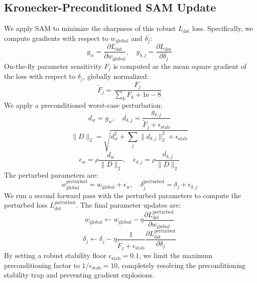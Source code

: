 \documentclass{article}
\theoremstyle{plain}
\theoremstyle{definition}
\theoremstyle{remark}
\begin{document}
\subsection{Kronecker-Preconditioned SAM Update}
We apply SAM to minimize the sharpness of this robust $L_{\text{dst}}$ loss. Specifically, we compute gradients with respect to $w_{\text{global}}$ and $\delta_j$:
\begin{equation}
    g_w = \frac{\partial L_{\text{dst}}}{\partial w_{\text{global}}}, \quad g_{\delta, j} = \frac{\partial L_{\text{dst}}}{\partial \delta_j}
\end{equation}
On-the-fly parameter sensitivity $F_j$ is computed as the mean square gradient of the loss with respect to $\delta_j$, globally normalized:
\begin{equation}
    \tilde{F}_j = \frac{F_j}{\sum_k F_k + 1\text{e}-8}
\end{equation}
We apply a preconditioned worst-case perturbation:
\begin{equation}
    d_w = g_w, \quad d_{\delta, j} = \frac{g_{\delta, j}}{\tilde{F}_j + \epsilon_{\text{stab}}}
\end{equation}
\begin{equation}
    \|D\|_2 = \sqrt{ d_w^2 + \sum_j \|d_{\delta, j}\|_2^2 + \epsilon_{\text{stab}} }
\end{equation}
\begin{equation}
    \epsilon_w = \rho \frac{d_w}{\|D\|_2}, \quad \epsilon_{\delta, j} = \rho \frac{d_{\delta, j}}{\|D\|_2}
\end{equation}
The perturbed parameters are:
\begin{equation}
    w^{\text{perturbed}}_{\text{global}} = w_{\text{global}} + \epsilon_w, \quad \delta^{\text{perturbed}}_j = \delta_j + \epsilon_{\delta, j}
\end{equation}
We run a second forward pass with the perturbed parameters to compute the perturbed loss $L^{\text{perturbed}}_{\text{dst}}$. The final parameter updates are:
\begin{equation}
    w_{\text{global}} \leftarrow w_{\text{global}} - \eta \frac{\partial L^{\text{perturbed}}_{\text{dst}}}{\partial w_{\text{global}}}
\end{equation}
\begin{equation}
    \delta_j \leftarrow \delta_j - \eta \frac{1}{\tilde{F}_j + \epsilon_{\text{stab}}} \frac{\partial L^{\text{perturbed}}_{\text{dst}}}{\partial \delta_j}
\end{equation}
By setting a robust stability floor $\epsilon_{\text{stab}} = 0.1$, we limit the maximum preconditioning factor to $1/\epsilon_{\text{stab}} = 10$, completely resolving the preconditioning stability trap and preventing gradient explosions.
\end{document}
